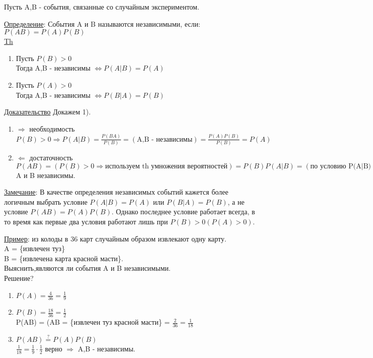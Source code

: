 
Пусть A,B - события, связанные со случайным экспериментом.

\underline{Определение}: События A и B называются независимыми, если: \\
$P(AB) = P(A) P(B)$ \\

\underline{Th} 
\begin{enumerate}
	\item[1)]
	Пусть $P(B) > 0$ \\
	Тогда A,B - независимы $\Leftrightarrow P(A|B) = P(A)$
	
	\item[2)]
	Пусть $P(A) > 0$ \\
	Тогда A,B - независимы $\Leftrightarrow P(B|A) = P(B)$
\end{enumerate}

\underline{Доказательство}
Докажем 1).
\begin{enumerate}
	\item[а)]
	$\Rightarrow$ необходимость \\
	$P(B) > 0 \Rightarrow P(A|B) = \frac{P(BA)}{P(B)} = (\text{A,B - независимы}) = \frac{P(A) P(B)}{P(B)} = P(A)$
	
	\item[б)] 
	$\Leftarrow$ достаточность \\
	$P(AB) = (P(B) > 0 \Rightarrow \text{используем th умножения вероятностей}) = P(B) P(A|B) = (\text{по условию P(A|B) = P(A)}) = P(A) P(B) \Rightarrow$ A и B  независимы.
\end{enumerate}

\underline{Замечание}: В качестве определения независимых событий кажется более логичным выбрать условие $P(A|B) = P(A)$ или $P(B|A) = P(B)$, а не условие $P(AB) = P(A) P(B)$. Однако последнее условие работает всегда, в то время как первые два условия работают лишь при $P(B) > 0 (P(A) > 0)$.

\underline{Пример}: из колоды в 36 карт случайным образом извлекают одну карту. \\
A = \{извлечен туз\} \\
B = \{извлечена карта красной масти\}. \\
Выяснить,являются ли события A и B  независимыми. \\
Решение? \\
\begin{enumerate}
	\item[1)] 
	$P(A) = \frac{4}{36} = \frac{1}{9}$ \\
	
	\item[2)]
	$P(B) = \frac{18}{36} = \frac{1}{2}$ \\
	P(AB) = (AB = \{извлечен туз красной масти\} = $\frac{2}{36} = \frac{1}{18}$
	
	\item[3)]
	$P(AB) \stackrel{?}{=} P(A) P(B)$ \\
	$\frac{1}{18} = \frac{1}{9} \cdot \frac{1}{2}$ верно $\Rightarrow$ A,B - независимы.
\end{enumerate}

